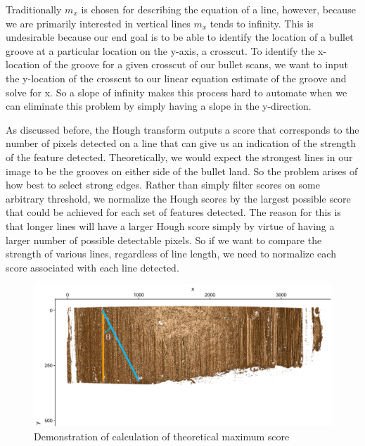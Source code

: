 \documentclass[12pt]{article}\usepackage[]{graphicx}\usepackage[]{color}
\newenvironment{knitrout}{}{} %
\theoremstyle{nonumberplain}
\begin{document}
Traditionally $m_x$ is chosen for describing the equation of a line, however, because we are primarily interested in vertical lines $m_x$ tends to infinity. This is undesirable because our end goal is to be able to identify the location of a bullet groove at a particular location on the y-axis, a crosscut. To identify the x-location of the groove for a given crosscut of our bullet scans, we want to input the y-location of the crosscut to our linear equation estimate of the groove and solve for x. So a slope of infinity makes this process hard to automate when we can eliminate this problem by simply having a slope in the y-direction. 

As discussed before, the Hough transform outputs a score that corresponds to the number of pixels detected on a line that can give us an indication of the strength of the feature detected. Theoretically, we would expect the strongest lines in our image to be the grooves on either side of the bullet land. So the problem arises of how best to select strong edges. Rather than simply filter scores on some arbitrary threshold, we normalize the Hough scores by the largest possible score that could be achieved for each set of features detected. The reason for this is that longer lines will have a larger Hough score simply by virtue of having a larger number of possible detectable pixels. So if we want to compare the strength of various lines, regardless of line length, we need to normalize each score associated with each line detected.  



\begin{knitrout}
\color{fgcolor}\begin{figure}[H]

{\centering \includegraphics[width=0.8\linewidth]{../images/calc-theoretical-max} 

}

\caption[Demonstration of calculation of theoretical maximum score]{Demonstration of calculation of theoretical maximum score}\label{fig:max-graphic-inclusion}
\end{figure}


\end{knitrout}
\end{document}

